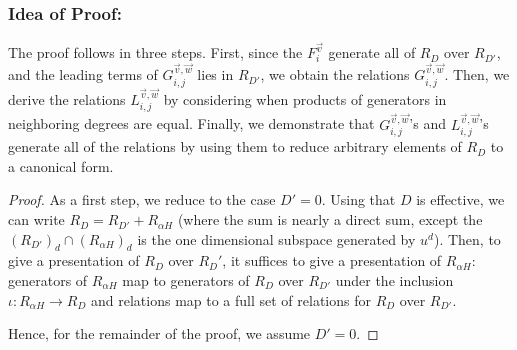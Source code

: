\documentclass{amsart}
\theoremstyle{plain}
\theoremstyle{definition}
\theoremstyle{remark}
\numberwithin{equation}{section}
\newcommand\sssec{\subsubsection}
\newcommand\bn{{\mathbb N}}
\newcommand\bp{{\mathbb P}}
\newcommand\bz{{\mathbb Z}}
\newcommand\mss{\mathscr{S}}
\begin{document}
\sssec*{Idea of Proof:}
The proof follows in three steps. 
First, since the
$F_{i}^{\vec{v}}$ generate
all of $R_D$ over $R_{D'}$, and the leading terms of
$G_{i,j}^{\vec v, \vec w}$ lies in $R_{D'}$, we obtain the
relations $G_{i, j}^{\vec{v}, \vec{w}}$. 
Then, we derive the relations
$L_{i, j}^{\vec{v}, \vec{w}}$ by considering when products of
generators in neighboring degrees are equal. Finally, we demonstrate
that $G_{i, j}^{\vec{v}, \vec{w}}$'s and $L_{i, j}^{\vec{v}, \vec{w}}$'s
generate all of the relations by using them to reduce arbitrary
elements of
$R_D$ to a canonical form.

\begin{proof}
As a first step, we reduce to the case $D' = 0$.
Using that $D$ is effective, we can write
$R_D = R_{D'} + R_{\alpha H}$ (where the sum is nearly a direct sum, except 
the $(R_{D'})_d \cap (R_{\alpha H})_d$ is the one dimensional subspace generated by $u^d$).
Then, to give a presentation of $R_D$ over $R_D'$,
it suffices to give a presentation of $R_{\alpha H}$:
generators of $R_{\alpha H}$ map to generators of $R_D$ over $R_{D'}$ under the inclusion $\iota: R_{\alpha H} \rightarrow R_D$
and relations map to a full set of relations for $R_D$ over $R_{D'}$.

Hence, for the remainder of the proof, we assume $D' = 0$.
%
%


\end{proof}
\end{document}
